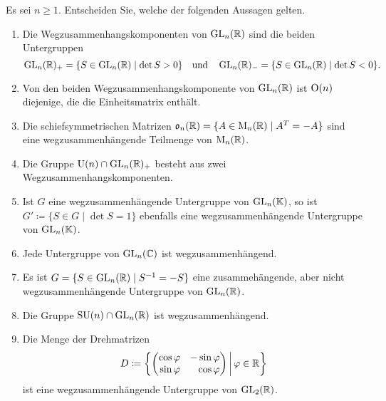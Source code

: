 \begin{question}[subtitle = Multiple Choice zu Wegzusammenhangskomponenten]{1}
  Es sei $n \geq 1$.
  Entscheiden Sie, welche der folgenden Aussagen gelten.
  \begin{enumerate}[leftmargin=*]
    \item
      Die Wegzusammenhangskomponenten von $\operatorname{GL}_n(\mathbb{R})$ sind die beiden Untergruppen
      \[
        \operatorname{GL}_n(\mathbb{R})_+ = \{ S \in \operatorname{GL}_n(\mathbb{R}) \mid \det S > 0 \}
        \quad\text{und}\quad
        \operatorname{GL}_n(\mathbb{R})_- = \{ S \in \operatorname{GL}_n(\mathbb{R}) \mid \det S < 0 \}.
      \]
    \item
      Von den beiden Wegzusammenhangskomponente von $\operatorname{GL}_n(\mathbb{R})$ ist $\operatorname{O}(n)$ diejenige, die die Einheitsmatrix enthält.
    \item
      Die schiefsymmetrischen Matrizen $\mathfrak{o}_n(\mathbb{R}) = \{ A \in \operatorname{M}_n(\mathbb{R}) \mid A^T = -A \}$ sind eine wegzusammenhängende Teilmenge von $\operatorname{M}_n(\mathbb{R})$.
    \item
      Die Gruppe $\operatorname{U}(n) \cap \operatorname{GL}_n(\mathbb{R})_+$ besteht aus zwei Wegzusammenhangskomponenten.
    \item
      Ist $G$ eine wegzusammenhängende Untergruppe von $\operatorname{GL}_n(\mathbb{K})$, so ist $G' \coloneqq \{ S \in G \mid \det S = 1 \}$ ebenfalls eine wegzusammenhängende Untergruppe von $\operatorname{GL}_n(\mathbb{K})$.
    \item
      Jede Untergruppe von $\operatorname{GL}_n(\mathbb{C})$ ist wegzusammenhängend.
    \item
      Es ist $G = \{ S \in \operatorname{GL}_n(\mathbb{R}) \mid S^{-1} = -S \}$ eine zusammehängende, aber nicht wegzusammenhängende Untergruppe von $\operatorname{GL}_n(\mathbb{R})$.
    \item
      Die Gruppe $\operatorname{SU}(n) \cap \operatorname{GL}_n(\mathbb{R})$ ist wegzusammenhängend.
    \item
      Die Menge der Drehmatrizen
      \[
        D
        \coloneqq
        \left\{
          \begin{pmatrix*}[r]
            \cos \varphi  & -\sin \varphi \\
            \sin \varphi  &  \cos \varphi 
          \end{pmatrix*}
        \,\middle|\,
        \varphi \in \Rbb
        \right\}
      \]
      ist eine wegzusammenhängende Untergruppe von $\operatorname{GL}_2(\mathbb{R})$.
  \end{enumerate}
\end{question}
